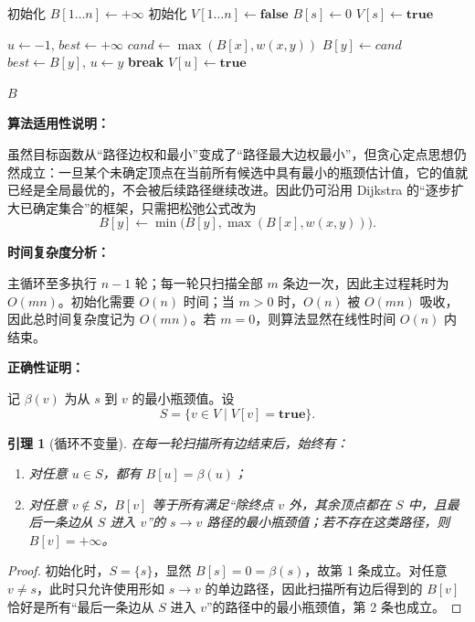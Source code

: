 ﻿\documentclass[12pt,a4paper]{article}
\newtheorem{lemma}{引理}
\begin{document}
\begin{answerbox}
\begin{algorithm}[H]
\begin{algorithmic}[1]
\STATE 初始化 $B[1 \dots n] \gets +\infty$
\STATE 初始化 $V[1 \dots n] \gets \textbf{false}$
\STATE $B[s] \gets 0$
\STATE $V[s] \gets \textbf{true}$

    \STATE $u \gets -1$, $best \gets +\infty$
            \STATE $cand \gets \max(B[x], w(x,y))$
                \STATE $B[y] \gets cand$
            \ENDIF
                \STATE $best \gets B[y]$, $u \gets y$
            \ENDIF
        \ENDIF
    \ENDFOR
        \STATE \textbf{break}
    \ENDIF
    \STATE $V[u] \gets \textbf{true}$
\ENDFOR

\RETURN $B$
\end{algorithmic}
\end{algorithm}

\textbf{算法适用性说明：}

虽然目标函数从“路径边权和最小”变成了“路径最大边权最小”，但贪心定点思想仍然成立：一旦某个未确定顶点在当前所有候选中具有最小的瓶颈估计值，它的值就已经是全局最优的，不会被后续路径继续改进。因此仍可沿用 Dijkstra 的“逐步扩大已确定集合”的框架，只需把松弛公式改为
\[
B[y] \gets \min\bigl(B[y], \max(B[x], w(x,y))\bigr).
\]

\textbf{时间复杂度分析：}

主循环至多执行 $n-1$ 轮；每一轮只扫描全部 $m$ 条边一次，因此主过程耗时为 $O(mn)$。初始化需要 $O(n)$ 时间；当 $m>0$ 时，$O(n)$ 被 $O(mn)$ 吸收，因此总时间复杂度记为 $O(mn)$。若 $m=0$，则算法显然在线性时间 $O(n)$ 内结束。

\textbf{正确性证明：}

记 $\beta(v)$ 为从 $s$ 到 $v$ 的最小瓶颈值。设
\[
S = \{v \in V \mid V[v] = \textbf{true}\}.
\]

\begin{lemma}[循环不变量]
在每一轮扫描所有边结束后，始终有：
\begin{enumerate}
    \item 对任意 $u \in S$，都有 $B[u] = \beta(u)$；
    \item 对任意 $v \notin S$，$B[v]$ 等于所有满足“除终点 $v$ 外，其余顶点都在 $S$ 中，且最后一条边从 $S$ 进入 $v$”的 $s \to v$ 路径的最小瓶颈值；若不存在这类路径，则 $B[v]=+\infty$。
\end{enumerate}
\end{lemma}

\begin{proof}
初始化时，$S=\{s\}$，显然 $B[s]=0=\beta(s)$，故第 1 条成立。对任意 $v \neq s$，此时只允许使用形如 $s \to v$ 的单边路径，因此扫描所有边后得到的 $B[v]$ 恰好是所有“最后一条边从 $S$ 进入 $v$”的路径中的最小瓶颈值，第 2 条也成立。


\end{proof}
\end{answerbox}
\end{document}
